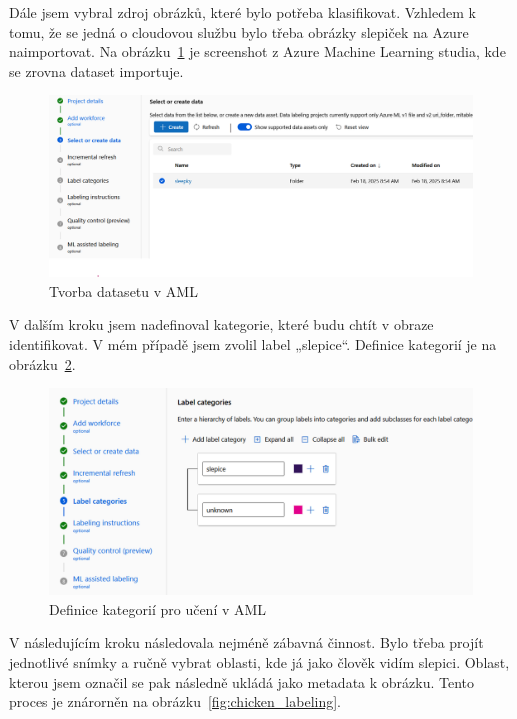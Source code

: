 Dále jsem vybral zdroj obrázků, které bylo potřeba klasifikovat.
Vzhledem k tomu, že se jedná o cloudovou službu bylo třeba obrázky slepiček na Azure naimportovat.
Na obrázku~\ref{fig:dataset_selection} je screenshot z Azure Machine Learning studia, kde se zrovna dataset importuje.

\begin{figure}[h]
    \centering
    \includegraphics[width=\textwidth]{img/dataset_selection}
    \caption{Tvorba datasetu v AML}
    \label{fig:dataset_selection}
\end{figure}

V dalším kroku jsem nadefinoval kategorie, které budu chtít v obraze identifikovat.
V mém případě jsem zvolil label „slepice“.
Definice kategorií je na obrázku~\ref{fig:category_definition}.

\begin{figure}[h]
    \centering
    \includegraphics[width=\textwidth]{img/category_definition}
    \caption{Definice kategorií pro učení v AML}
    \label{fig:category_definition}
\end{figure}

V následujícím kroku následovala nejméně zábavná činnost.
Bylo třeba projít jednotlivé snímky a ručně vybrat oblasti, kde já jako člověk vidím slepici.
Oblast, kterou jsem označil se pak následně ukládá jako metadata k obrázku.
Tento proces je znárorněn na obrázku~\ref{fig:chicken_labeling}.

